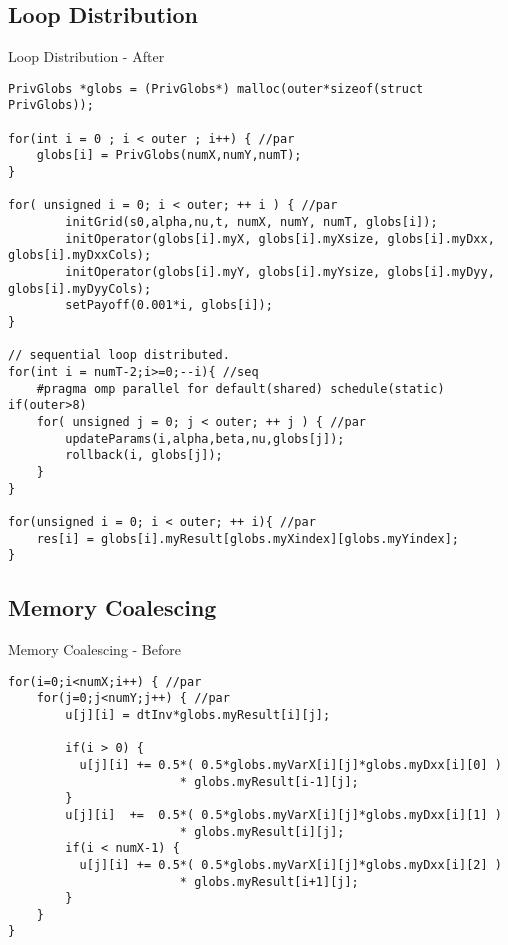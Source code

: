 \documentclass[xcolor=x11names,compress]{beamer}
\begin{document}
\subsection{Loop Distribution}
\begin{frame}[fragile]{Loop Distribution - After}
\begin{verbatim}
PrivGlobs *globs = (PrivGlobs*) malloc(outer*sizeof(struct PrivGlobs));

for(int i = 0 ; i < outer ; i++) { //par
    globs[i] = PrivGlobs(numX,numY,numT);
}

for( unsigned i = 0; i < outer; ++ i ) { //par
        initGrid(s0,alpha,nu,t, numX, numY, numT, globs[i]);
        initOperator(globs[i].myX, globs[i].myXsize, globs[i].myDxx, globs[i].myDxxCols);
        initOperator(globs[i].myY, globs[i].myYsize, globs[i].myDyy, globs[i].myDyyCols);
        setPayoff(0.001*i, globs[i]);
}

// sequential loop distributed.
for(int i = numT-2;i>=0;--i){ //seq
    #pragma omp parallel for default(shared) schedule(static) if(outer>8)
    for( unsigned j = 0; j < outer; ++ j ) { //par
        updateParams(i,alpha,beta,nu,globs[j]);
        rollback(i, globs[j]);
    }
}

for(unsigned i = 0; i < outer; ++ i){ //par
    res[i] = globs[i].myResult[globs.myXindex][globs.myYindex];
}

\end{verbatim}
\end{frame}

\subsection{Memory Coalescing}
\begin{frame}[fragile]{Memory Coalescing - Before}
\begin{verbatim}
for(i=0;i<numX;i++) { //par
    for(j=0;j<numY;j++) { //par
        u[j][i] = dtInv*globs.myResult[i][j];

        if(i > 0) {
          u[j][i] += 0.5*( 0.5*globs.myVarX[i][j]*globs.myDxx[i][0] )
                        * globs.myResult[i-1][j];
        }
        u[j][i]  +=  0.5*( 0.5*globs.myVarX[i][j]*globs.myDxx[i][1] )
                        * globs.myResult[i][j];
        if(i < numX-1) {
          u[j][i] += 0.5*( 0.5*globs.myVarX[i][j]*globs.myDxx[i][2] )
                        * globs.myResult[i+1][j];
        }
    }
}
\end{verbatim}
\end{frame}
\end{document}
